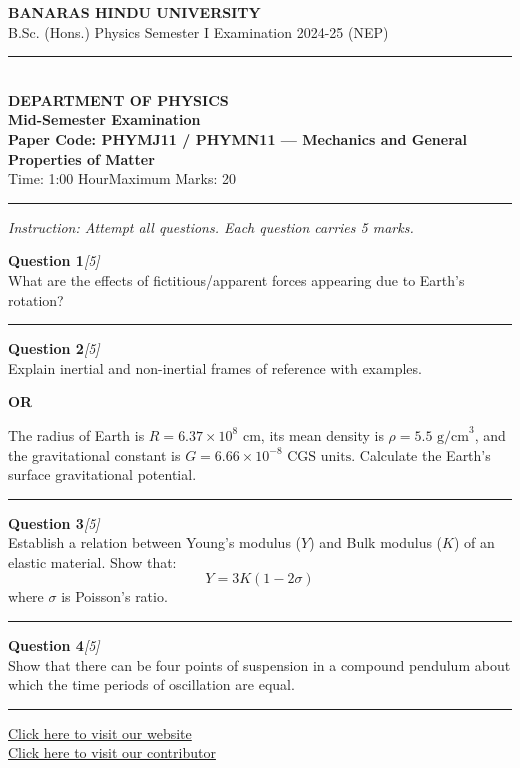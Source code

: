\documentclass[11pt,a4paper]{article}
\newcommand{\pts}[1]{\hfill   \textit{[#1]}}
\begin{document}
\begin{center}
  {\large\bfseries BANARAS HINDU UNIVERSITY}\\[2pt]
  {\normalsize B.Sc. (Hons.) Physics Semester I Examination 2024-25 (NEP)}\\[6pt]
  \rule{0.8\linewidth}{0.5pt}\\[6pt]
  {\large\bfseries DEPARTMENT OF PHYSICS}\\[4pt]
  {\large\bfseries Mid-Semester Examination}\\[4pt]
  {\large\bfseries Paper Code: PHYMJ11 / PHYMN11 --- Mechanics and General Properties of Matter}\\[4pt]
  {\normalsize Time: 1:00 Hour\hfill Maximum Marks: 20}
\end{center}

\rule{\linewidth}{0.4pt}\smallskip



\noindent   \textit{Instruction: Attempt all questions. Each question carries 5 marks.}
\bigskip




\noindent   \textbf{Question 1}\pts{5} \\
What are the effects of fictitious/apparent forces appearing due to Earth's rotation?

\medskip\rule{\linewidth}{0.2pt}\medskip




\noindent   \textbf{Question 2}\pts{5} \\
Explain inertial and non-inertial frames of reference with examples.


\begin{center}   \textbf{OR}\end{center}

The radius of Earth is $R = 6.37  \times 10^8 \text{ cm}$, its mean density is $\rho = 5.5 \text{ g/cm}^3$, and the gravitational constant is $G = 6.66  \times 10^{-8} \text{ CGS units}$. Calculate the Earth's surface gravitational potential.

\medskip\rule{\linewidth}{0.2pt}\medskip




\noindent   \textbf{Question 3}\pts{5} \\
Establish a relation between Young's modulus ($Y$) and Bulk modulus ($K$) of an elastic material. Show that:
\[
Y = 3K(1 - 2\sigma)
\]
where $\sigma$ is Poisson's ratio.

\medskip\rule{\linewidth}{0.2pt}\medskip




\noindent   \textbf{Question 4}\pts{5} \\
Show that there can be four points of suspension in a compound pendulum about which the time periods of oscillation are equal.

\vfill\rule{\linewidth}{0.4pt}

\begin{center}\small
\href{https://bhu-exam.vercel.app/}{Click here to visit our website}\\[4pt]
\href{https://me-aryan.vercel.app/}{Click here to visit our contributor}
\end{center}
\end{document}
